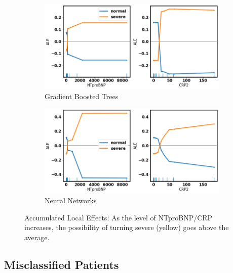 \vfill

\clearpage

\null
\vfill

\begin{figure}[H] \ContinuedFloat
\begin{subfigure}[b]{\textwidth}
    \centering
    \includegraphics[width=\textwidth]{figures/chapter_interp/xgbc_ALE_NTproBNP_CRP.png}
    \caption{Gradient Boosted Trees}
    \label{fig:gbt_ale}
\end{subfigure}
\hfill
\begin{subfigure}[b]{\textwidth}
    \centering
    \includegraphics[width=\textwidth]{figures/chapter_interp/nn_ALE_NTproBNP_CRP.png}
    \caption{Neural Networks}
    \label{fig:nn_ale}
\end{subfigure}
\caption{Accumulated Local Effects: As the level of NTproBNP/CRP increases, the possibility of turning severe (yellow) goes above the average.}
\label{fig.ale}
\end{figure}

\vfill

\clearpage

\subsection{Misclassified Patients}

